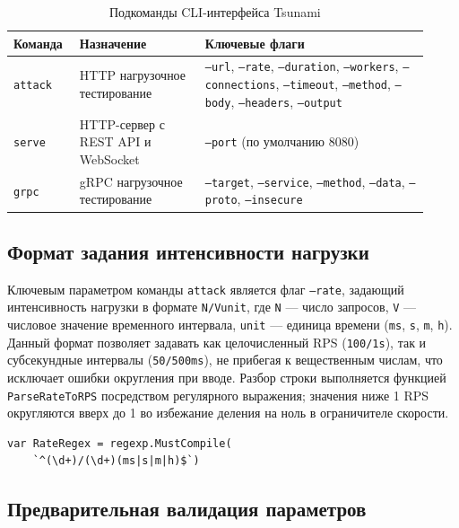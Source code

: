\begin{table}[h!]
  \centering
  \caption{Подкоманды CLI-интерфейса Tsunami}
  \label{tab:ch2-commands}
  \small
  \begin{tabular}{|p{0.14\linewidth}|p{0.28\linewidth}|>{\raggedright\arraybackslash}p{0.50\linewidth}|}
    \hline
    \textbf{Команда} & \textbf{Назначение} & \textbf{Ключевые флаги} \\
    \hline
    \texttt{attack} & HTTP нагрузочное тестирование &
      \texttt{--url}, \texttt{--rate}, \texttt{--duration}, \texttt{--workers},
      \texttt{--connections}, \texttt{--timeout}, \texttt{--method}, \texttt{--body},
      \texttt{--headers}, \texttt{--output} \\
    \hline
    \texttt{serve} & HTTP-сервер с REST API и WebSocket &
      \texttt{--port} (по умолчанию 8080) \\
    \hline
    \texttt{grpc} & gRPC нагрузочное тестирование &
      \texttt{--target}, \texttt{--service}, \texttt{--method}, \texttt{--data},
      \texttt{--proto}, \texttt{--insecure} \\
    \hline
  \end{tabular}
\end{table}

\subsection*{Формат задания интенсивности нагрузки}

Ключевым параметром команды \texttt{attack} является флаг \texttt{--rate}, задающий интенсивность нагрузки в формате \texttt{N/Vunit}, где \texttt{N} --- число запросов, \texttt{V} --- числовое значение временного интервала, \texttt{unit} --- единица времени (\texttt{ms}, \texttt{s}, \texttt{m}, \texttt{h}).
Данный формат позволяет задавать как целочисленный RPS (\texttt{100/1s}), так и субсекундные интервалы (\texttt{50/500ms}), не прибегая к вещественным числам, что исключает ошибки округления при вводе.
Разбор строки выполняется функцией \texttt{ParseRateToRPS} посредством регулярного выражения; значения ниже 1 RPS округляются вверх до 1 во избежание деления на ноль в ограничителе скорости.

\begin{lstlisting}[caption={Регулярное выражение для разбора формата rate},label={lst:rate}]
var RateRegex = regexp.MustCompile(
    `^(\d+)/(\d+)(ms|s|m|h)$`)
\end{lstlisting}

\subsection*{Предварительная валидация параметров}

